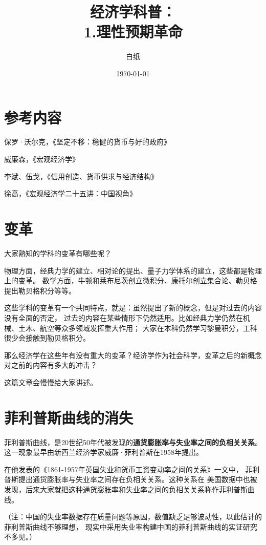 \documentclass[UTF8]{article}
\title{经济学科普： \\ 1.理性预期革命}
\author{白纸}
\date{\today}
\begin{document}
\maketitle

\section{参考内容}
    保罗·沃尔克，《坚定不移：稳健的货币与好的政府》\par
    威廉森，《宏观经济学》\par
    李斌、伍戈，《信用创造、货币供求与经济结构》\par
    徐高，《宏观经济学二十五讲：中国视角》

\section{变革}
    大家熟知的学科的变革有哪些呢？\par
    物理方面，经典力学的建立、相对论的提出、量子力学体系的建立，这些都是物理上的变革。
    数学方面，牛顿和莱布尼茨创立微积分、康托尔创立集合论、勒贝格提出勒贝格积分等等。\par
    这些学科的变革有一个共同特点，就是：虽然提出了新的概念，但是对过去的内容没有全面的否定，
    过去的内容在某些情形下仍然适用。比如经典力学仍然在机械、土木、航空等众多领域发挥重大作用；
    大家在本科仍然学习黎曼积分，工科很少会接触到勒贝格积分。\par
    那么经济学在这些年有没有重大的变革？经济学作为社会科学，变革之后的新概念对之前的内容有多大的冲击？\par
    这篇文章会慢慢给大家讲述。

\section{菲利普斯曲线的消失}
    菲利普斯曲线，是20世纪50年代被发现的\textbf{通货膨胀率与失业率之间的负相关关系}。
    这一现象最早由新西兰经济学家威廉·菲利普斯在1958年提出。\par
    在他发表的《1861-1957年英国失业和货币工资变动率之间的关系》一文中，
    菲利普斯提出通货膨胀率与失业率之间存在负相关关系。这种关系在
    美国数据中也被发现，后来大家就把这种通货膨胀率和失业率之间的负相关关系称作菲利普斯曲线。\par
    （注：中国的失业率数据存在质量问题等原因，数值缺乏足够波动性，以此估计的菲利普斯曲线不够理想，
    现实中采用失业率构建中国的菲利普斯曲线的实证研究不多见。）\par
    
\end{document}
